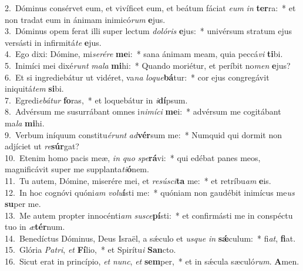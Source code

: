 {2.~}Dóminus consérvet eum, et vivíficet eum, et beátum fáciat \textit{e}\textit{um} \textit{in} \textbf{ter}ra:~* et non tradat eum in ánimam inimicó\textit{rum} \textbf{e}jus.\\
{3.~}Dóminus opem ferat illi super lectum \textit{do}\textit{ló}\textit{ris} \textbf{e}jus:~* univérsum stratum ejus versásti in infirmitá\textit{te} \textbf{e}jus.\\
{4.~}Ego dixi: Dómine, mi\textit{se}\textit{ré}\textit{re} \textbf{me}i:~* sana ánimam meam, quia peccá\textit{vi} \textbf{ti}bi.\\
{5.~}Inimíci mei dixé\textit{runt} \textit{ma}\textit{la} \textbf{mi}hi:~* Quando moriétur, et períbit no\textit{men} \textbf{e}jus?\\
{6.~}Et si ingrediebátur ut vidéret, va\textit{na} \textit{lo}\textit{que}\textbf{bá}tur:~* cor ejus congregávit iniquitá\textit{tem} \textbf{si}bi.\\
{7.~}Egredi\textit{e}\textit{bá}\textit{tur} \textbf{fo}ras,~* et loquebátur in \textit{i}\textbf{dí}psum.\\
{8.~}Advérsum me susurrábant omnes i\textit{ni}\textit{mí}\textit{ci} \textbf{me}i:~* advérsum me cogitábant ma\textit{la} \textbf{mi}hi.\\
{9.~}Verbum iníquum constitu\textit{é}\textit{runt} \textit{ad}\textbf{vér}sum me:~* Numquid qui dormit non adjíciet ut \textit{re}\textbf{súr}gat?\\
{10.~}Etenim homo pacis meæ, \textit{in} \textit{quo} \textit{spe}\textbf{rá}vi:~* qui edébat panes meos, magnificávit super me supplanta\textit{ti}\textbf{ó}nem.\\
{11.~}Tu autem, Dómine, miserére mei, et \textit{re}\textit{sú}\textit{sci}\textbf{ta} me:~* et retríbu\textit{am} \textbf{e}is.\\
{12.~}In hoc cognóvi quóni\textit{am} \textit{vo}\textit{lu}\textbf{í}sti me:~* quóniam non gaudébit inimícus me\textit{us} \textbf{su}per me.\\
{13.~}Me autem propter innocénti\textit{am} \textit{su}\textit{sce}\textbf{pí}sti:~* et confirmásti me in conspéctu tuo in \textit{æ}\textbf{tér}num.\\
{14.~}Benedíctus Dóminus, Deus Israël, a sǽculo et \textit{us}\textit{que} \textit{in} \textbf{sǽ}culum:~* fi\textit{at}, \textbf{fi}at.\\
{15.~}Glória \textit{Pa}\textit{tri}, \textit{et} \textbf{Fí}lio,~* et Spirítu\textit{i} \textbf{San}cto.\\
{16.~}Sicut erat in princípio, \textit{et} \textit{nunc}, \textit{et} \textbf{sem}per,~* et in sǽcula sæculó\textit{rum}. \textbf{A}men.\\
